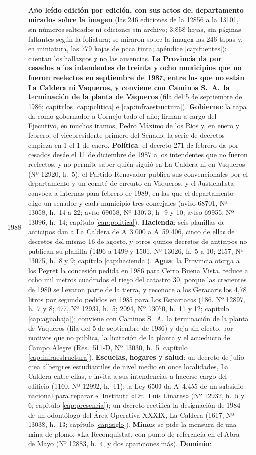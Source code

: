 \begin{longtable}{@{}p{2.7cm}p{10.3cm}@{}}
1988 & \textbf{Año leído edición por edición, con sus actos del departamento mirados sobre la imagen} (las 246 ediciones de la 12856 a la 13101, sin números salteados ni ediciones sin archivo; 3.858 hojas, sin páginas faltantes según la foliatura; se miraron sobre la imagen las 246 tapas y, en miniatura, las 779 hojas de poca tinta; apéndice \ref{cap:fuentes}): cuentan los hallazgos y no las ausencias. \textbf{La Provincia da por cesados a los intendentes de treinta y ocho municipios que no fueron reelectos en septiembre de 1987, entre los que no están La Caldera ni Vaqueros, y conviene con Caminos S.\ A.\ la terminación de la planta de Vaqueros} (fila del 5 de septiembre de 1986; capítulos \ref{cap:politica} e \ref{cap:infraestructura}). \textbf{Gobierno}: la tapa da como gobernador a Cornejo todo el año; firman a cargo del Ejecutivo, en muchos tramos, Pedro Máximo de los Ríos y, en enero y febrero, el vicepresidente primero del Senado; la serie de decretos empieza en 1 el 1 de enero. \textbf{Política}: el decreto 271 de febrero da por cesados desde el 11 de diciembre de 1987 a los intendentes que no fueron reelectos, y no permite saber quién siguió en La Caldera ni en Vaqueros (Nº 12920, h.\ 5); el Partido Renovador publica sus convencionales por el departamento y un comité de circuito en Vaqueros, y el Justicialista convoca a internas para febrero de 1989, en las que el departamento elige un senador y cada municipio tres concejales (aviso 68701, Nº 13058, h.\ 14 a 22; aviso 69058, Nº 13073, h.\ 9 y 10; aviso 69955, Nº 13096, h.\ 14; capítulo \ref{cap:politica}). \textbf{Hacienda}: seis planillas de anticipos dan a La Caldera de A~3.000 a A~59.406, cinco de ellas de decretos del mismo 16 de agosto, y otros quince decretos de anticipos no publican su planilla (1496 a 1499 y 1501, Nº 13026, h.\ 5 a 10; 2157, Nº 13075, h.\ 8 y 9; capítulo \ref{cap:hacienda}). \textbf{Agua}: la Provincia otorga a los Peyret la concesión pedida en 1986 para Cerro Buena Vista, reduce a ocho mil metros cuadrados el riego del catastro 30, porque las crecientes de 1980 se llevaron parte de la tierra, y reconoce a los Geracaris los 4,78 litros por segundo pedidos en 1985 para Los Espartacos (186, Nº 12897, h.\ 7 y 8; 477, Nº 12939, h.\ 5; 2094, Nº 13070, h.\ 11 y 12; capítulo \ref{cap:aguabaja}); conviene con Caminos S.\ A.\ la terminación de la planta de Vaqueros (fila del 5 de septiembre de 1986) y deja sin efecto, por motivos que no publica, la licitación de la planta y el acueducto de Campo Alegre (Res.\ 511-D, Nº 13030, h.\ 5; capítulo \ref{cap:infraestructura}). \textbf{Escuelas, hogares y salud}: un decreto de julio crea albergues estudiantiles de nivel medio en once localidades, La Caldera entre ellas, e invita a sus intendencias a hacerse cargo del edificio (1160, Nº 12992, h.\ 11); la Ley 6500 da A~4.455 de un subsidio nacional para reparar el Instituto «Dr.\ Luis Linares» (Nº 12932, h.\ 5 y 6; capítulo \ref{cap:presencia}); un decreto rectifica la designación de 1984 de un odontólogo del Área Operativa XXXIX, La Caldera (1617, Nº 13038, h.\ 13; capítulo \ref{cap:siglo}). \textbf{Minas}: se pide la mensura de una mina de plomo, «La Reconquista», con punto de referencia en el Abra de Mayo (Nº 12883, h.\ 4, y dos apariciones más). \textbf{Dominio}: 
\end{longtable}
